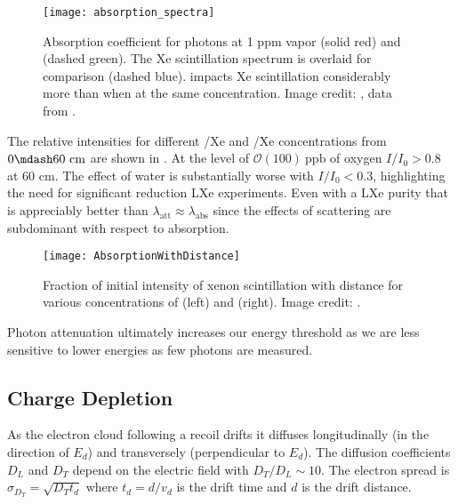 \begin{figure}
\centering
\texttt{[image: absorption\_spectra]}
\caption{Absorption coefficient for photons at 1 ppm  vapor (solid red) and  (dashed green).  The Xe scintillation
spectrum is overlaid for comparison (dashed blue).   impacts Xe scintillation considerably
more than  when at the same concentration.  Image credit: ,  data from .}
\label{fig:importance_procedure_effects_photons_absorption_coefficents}
\end{figure}

The relative intensities for different /Xe and /Xe concentrations from $0 \mdash 60\ \mathrm{cm}$ are shown in
.  At the level of $\mathcal{O}(100)\ \mathrm{ppb}$ of
oxygen $I / I_0 > 0.8$ at 60 cm.  The effect of water is substantially worse with $I / I_0 < 0.3$, highlighting the need for
significant reduction LXe experiments.  Even with a LXe purity that is appreciably better than
 $\lambda_{\mathrm{att}} \approx \lambda_{\mathrm{abs}}$ since
the effects of scattering are subdominant with respect to absorption.

\begin{figure}
\centering
\texttt{[image: AbsorptionWithDistance]}
\caption{Fraction of initial intensity of xenon scintillation with distance for various concentrations of \htwoo (left) and \otwo
(right).  Image credit: .}
\label{fig:importance_procedure_effects_photons_absorption_distance}
\end{figure}

Photon attenuation ultimately increases our energy threshold as we are less sensitive to lower energies as few photons are
measured.



\subsection{Charge Depletion}
\label{subsubsec:importance_procedure_effects_charge}
As the electron cloud following a recoil drifts it diffuses
longitudinally (in the direction of $E_{d}$) and transversely (perpendicular to $E_{d}$).  The
diffusion coefficients $D_{L}$ and $D_{T}$ depend on the electric field with $D_{T}/D_{L} \sim 10$.  The electron spread is
$\sigma_{D_{T}} = \sqrt{D_{T} t_{d}}$ where $t_{d} = d/v_{d}$ is the drift time and $d$ is the drift distance.

